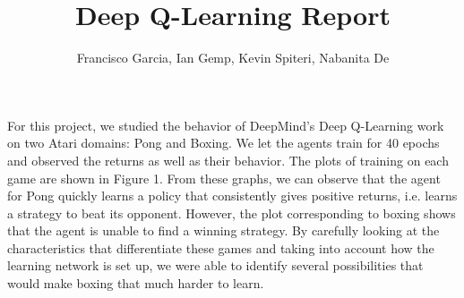 \documentclass[a4paper]{article}
\begin{document}
\title{Deep Q-Learning Report}
\author{Francisco Garcia, Ian Gemp, Kevin Spiteri, Nabanita De}

\maketitle


For this project, we studied the behavior of DeepMind's Deep Q-Learning work on two Atari domains: Pong and Boxing.
We let the agents train for 40 epochs and observed the returns as well as their behavior. The plots of training on each game are shown in Figure 1.
From these graphs, we can observe that the agent for Pong quickly learns a policy that consistently gives positive returns, i.e. learns a strategy to beat its opponent. However, the plot corresponding to boxing shows that the agent is unable to find a winning strategy.
By carefully looking at the characteristics that differentiate these games and taking into account how the learning network is set up, we were able to identify several possibilities that would make boxing that much harder to learn.
\end{document}
